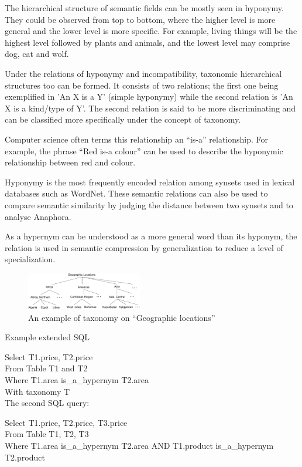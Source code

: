 The hierarchical structure of semantic fields can be mostly seen in hyponymy. They could be observed from top to bottom, where the higher level is more general and the lower level is more specific. For example, living things will be the highest level followed by plants and animals, and the lowest level may comprise dog, cat and wolf.

Under the relations of hyponymy and incompatibility, taxonomic hierarchical structures too can be formed. It consists of two relations; the first one being exemplified in 'An X is a Y' (simple hyponymy) while the second relation is 'An X is a kind/type of Y'. The second relation is said to be more discriminating and can be classified more specifically under the concept of taxonomy.

Computer science often terms this relationship an ``is-a'' relationship. For example, the phrase ``Red is-a colour'' can be used to describe the hyponymic relationship between red and colour.

Hyponymy is the most frequently encoded relation among synsets used in lexical databases such as WordNet. These semantic relations can also be used to compare semantic similarity by judging the distance between two synsets and to analyse Anaphora.

As a hypernym can be understood as a more general word than its hyponym, the relation is used in semantic compression by generalization to reduce a level of specialization.

\begin{figure}[t]
\centering
\includegraphics[width=0.45\textwidth]{figures/taxonomy}
 \caption{An example of taxonomy on ``\textsf{Geographic locations}''}
\label{fig:taxonomy}
\end{figure}

Example extended SQL

Select  T1.price, T2.price \\
From Table T1 and T2 \\
Where T1.area is\_a\_hypernym T2.area \\
With taxonomy T \\


The second SQL query:

Select  T1.price, T2.price, T3.price \\
From Table T1, T2, T3 \\
Where T1.area is\_a\_hypernym T2.area AND T1.product is\_a\_hypernym T2.product

